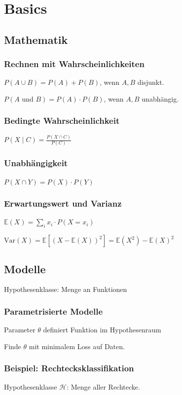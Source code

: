 \section*{Basics}

\subsection*{Mathematik}
\subsubsection*{Rechnen mit Wahrscheinlichkeiten}
$P(A \cup B) = P(A) + P(B)$, wenn $A,B$ disjunkt.

$P(A \text{ und } B) = P(A) \cdot P(B)$, wenn $A,B$ unabhängig.


\subsubsection*{Bedingte Wahrscheinlichkeit}
$\displaystyle P(X \mid C) = \frac{P(X \cap C)}{P(C)}$

\subsubsection*{Unabhängigkeit}
$P(X \cap Y) = P(X) \cdot P(Y)$

\subsubsection*{Erwartungswert und Varianz}
$\displaystyle \mathbb{E}(X) = \sum_i x_i \cdot P(X = x_i)$

$\displaystyle \text{Var}(X) = \mathbb{E}[(X-\mathbb{E}(X))^2] = \mathbb{E}(X^2) - \mathbb{E}(X)^2$

\subsection*{Modelle}
Hypothesenklasse: Menge an Funktionen

\subsubsection*{Parametrisierte Modelle}
Parameter $\theta$ definiert Funktion im Hypothesenraum

Finde $\theta$ mit minimalem Loss auf Daten.

\subsubsection*{Beispiel: Rechtecksklassifikation}
Hypothesenklasse $\mathcal{H}$: Menge aller Rechtecke.

